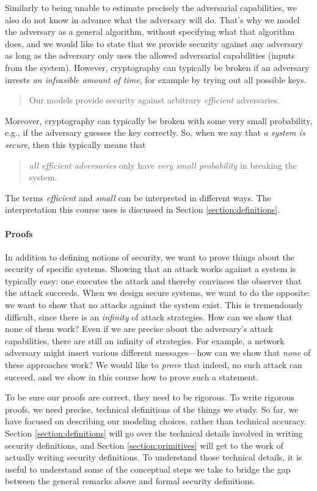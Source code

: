 Similarly to being unable to estimate precisely the adversarial capabilities, we also do not know in advance what the adversary will do.
That's why we model the adversary as a general algorithm, without specifying what that algorithm does, and we would like to state that we provide security against any adversary as long as the adversary only uses the allowed adversarial capabilities (inputs from the system).
However, cryptography can typically be broken if an adversary invests \emph{an infeasible amount of time}, for example by trying out all possible keys.

\begin{quote}
Our models provide security against arbitrary \emph{efficient} adversaries.
\end{quote}
Moreover, cryptography can typically be broken with some very small probability, e.g., if the adversary guesses the key correctly.
So, when we say that \emph{a system is secure}, then this typically means that 

\begin{quote}
\emph{all efficient
adversaries} only have \emph{very small probability} in breaking the system. 
\end{quote}
The terms \emph{efficient} and \emph{small} can be interpreted in different ways. 
The interpretation this course uses is discussed in Section \ref{section:definitions}.

\paragraph{Proofs}
In addition to defining notions of security, we want to prove things about the security of specific systems.
Showing that an attack works against a system is typically easy: one executes the attack and thereby
convinces the observer that the attack succeeds. 
When we design secure systems, we want to do the opposite: we want to show that no attacks against the system exist. 
This is tremendously difficult, since there is an \emph{infinity} of attack strategies. 
How can we show that none of them work?
Even if we are precise about the adversary's attack capabilities, there are still an infinity of
strategies.
For example, a network adversary might insert various different messages---how can
we show that \emph{none} of these approaches work?
We would like to \emph{prove} that indeed, no such attack can succeed, and we show in this course
how to prove such a statement.

To be sure our proofs are correct, they need to be rigorous. 
To write rigorous proofs, we need precise, technical definitions of the things we study. 
So far, we have focused on describing our modeling choices, rather than technical accuracy.
Section \ref{section:definitions} will go over the technical details involved in writing security definitions, and Section \ref{section:primitives} will get to the work of actually writing security definitions.
To understand those technical details, it is useful to understand some of the conceptual steps we take to bridge the gap between the general remarks above and formal security definitions.

